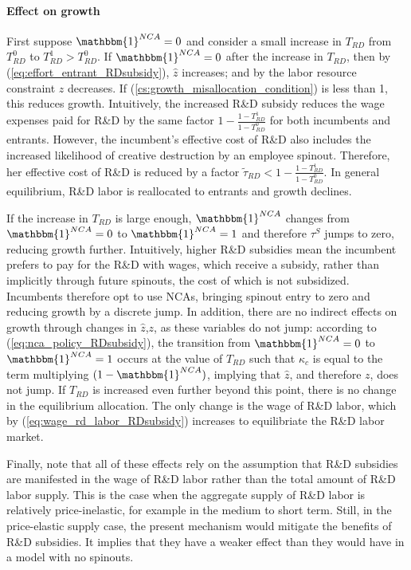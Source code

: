 \documentclass[11pt,english]{article}
\theoremstyle{definition}
\begin{document}
\paragraph{Effect on growth}

First suppose $\mathbbm{1}^{NCA} = 0$ and consider a small increase in $T_{RD}$ from $T_{RD}^0$ to $T_{RD}^1 > T_{RD}^0$. If $\mathbbm{1}^{NCA} = 0$ after the increase in $T_{RD}$, then by (\ref{eq:effort_entrant_RDsubsidy}), $\hat{z}$ increases; and by the labor resource constraint $z$ decreases. If (\ref{cs:growth_misallocation_condition}) is less than 1, this reduces growth. Intuitively, the increased R\&D subsidy reduces the wage expenses paid for R\&D by the same factor $1-\frac{1-T_{RD}^1}{1-T_{RD}^0}$ for both incumbents and entrants. However, the incumbent's effective cost of R\&D also includes the increased likelihood of creative destruction by an employee spinout. Therefore, her effective cost of R\&D is reduced by a factor $\tilde{\tau}_{RD} < 1-\frac{1-T_{RD}^1}{1-T_{RD}^0}$. In general equilibrium, R\&D labor is reallocated to entrants and growth declines.

If the increase in $T_{RD}$ is large enough, $\mathbbm{1}^{NCA}$ changes from $\mathbbm{1}^{NCA} = 0$ to $\mathbbm{1}^{NCA} = 1$ and therefore $\tau^S$ jumps to zero, reducing growth further. Intuitively, higher R\&D subsidies mean the incumbent prefers to pay for the R\&D with wages, which receive a subsidy, rather than implicitly through future spinouts, the cost of which is not subsidized. Incumbents therefore opt to use NCAs, bringing spinout entry to zero and reducing growth by a discrete jump. In addition, there are no indirect effects on growth through changes in $\hat{z}$,$z$, as these variables do not jump: according to (\ref{eq:nca_policy_RDsubsidy}), the transition from $\mathbbm{1}^{NCA} = 0$ to $\mathbbm{1}^{NCA} =1$ occurs at the value of $T_{RD}$ such that $\kappa_c$ is equal to the term multiplying $(1-\mathbbm{1}^{NCA})$, implying that $\hat{z}$, and therefore $z$, does not jump. If $T_{RD}$ is increased even further beyond this point, there is no change in the equilibrium allocation. The only change is the wage of R\&D labor, which by (\ref{eq:wage_rd_labor_RDsubsidy}) increases to equilibriate the R\&D labor market.

Finally, note that all of these effects rely on the assumption that R\&D subsidies are manifested in the wage of R\&D labor rather than the total amount of R\&D labor supply. This is the case when the aggregate supply of R\&D labor is relatively price-inelastic, for example in the medium to short term. Still, in the price-elastic supply case, the present mechanism would mitigate the benefits of R\&D subsidies. It implies that they have a weaker effect than they would have in a model with no spinouts. 
\end{document}
